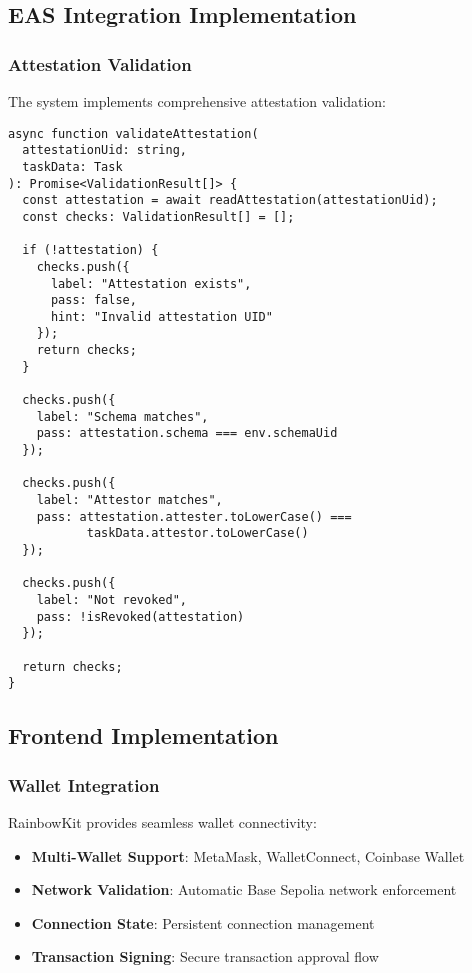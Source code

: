 \documentclass[12pt,a4paper]{article}
\begin{document}
\subsection{EAS Integration Implementation}

\subsubsection{Attestation Validation}

The system implements comprehensive attestation validation:

\begin{lstlisting}[style=typescript]
async function validateAttestation(
  attestationUid: string,
  taskData: Task
): Promise<ValidationResult[]> {
  const attestation = await readAttestation(attestationUid);
  const checks: ValidationResult[] = [];
  
  if (!attestation) {
    checks.push({
      label: "Attestation exists",
      pass: false,
      hint: "Invalid attestation UID"
    });
    return checks;
  }
  
  checks.push({
    label: "Schema matches",
    pass: attestation.schema === env.schemaUid
  });
  
  checks.push({
    label: "Attestor matches", 
    pass: attestation.attester.toLowerCase() === 
           taskData.attestor.toLowerCase()
  });
  
  checks.push({
    label: "Not revoked",
    pass: !isRevoked(attestation)
  });
  
  return checks;
}
\end{lstlisting}

\subsection{Frontend Implementation}

\subsubsection{Wallet Integration}

RainbowKit provides seamless wallet connectivity:
\begin{itemize}
    \item \textbf{Multi-Wallet Support}: MetaMask, WalletConnect, Coinbase Wallet
    \item \textbf{Network Validation}: Automatic Base Sepolia network enforcement
    \item \textbf{Connection State}: Persistent connection management
    \item \textbf{Transaction Signing}: Secure transaction approval flow
\end{itemize}
\end{document}
